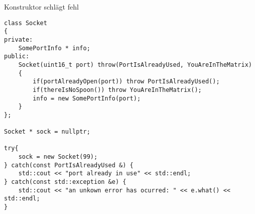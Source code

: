 \begin{frame}[fragile]{Konstruktor schlägt fehl}
	\begin{lstlisting}[]
class Socket
{
private:
	SomePortInfo * info;
public:
	Socket(uint16_t port) throw(PortIsAlreadyUsed, YouAreInTheMatrix)
	{
		if(portAlreadyOpen(port)) throw PortIsAlreadyUsed();
		if(thereIsNoSpoon()) throw YouAreInTheMatrix();
		info = new SomePortInfo(port);
	}
};

Socket * sock = nullptr;

try{
	sock = new Socket(99);
} catch(const PortIsAlreadyUsed &) {
	std::cout << "port already in use" << std::endl;
} catch(const std::exception &e) {
	std::cout << "an unkown error has ocurred: " << e.what() << std::endl;
}
	\end{lstlisting}

\end{frame}
